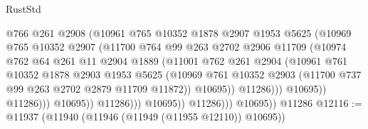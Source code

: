 \begin{lexlean}{RustStd}
\begin{coremodule}
                                    @766
                                    @261
                                    @2908
                                    (@10961
                                      @765
                                      @10352
                                      @1878
                                      @2907
                                      @1953
                                      @5625
                                      (@10969
                                        @765
                                        @10352
                                        @2907
                                        (@11700
                                          @764
                                          @99
                                          @263
                                          @2702
                                          @2906
                                          @11709
                                          (@10974
                                            @762
                                            @64
                                            @261
                                            @11
                                            @2904
                                            @1889
                                            (@11001
                                              @762
                                              @261
                                              @2904
                                              (@10961
                                                @761
                                                @10352
                                                @1878
                                                @2903
                                                @1953
                                                @5625
                                                (@10969
                                                  @761
                                                  @10352
                                                  @2903
                                                  (@11700 @737 @99 @263 @2702 @2879 @11709 @11872))
                                                @10695))
                                            @11286)))
                                      @10695))
                                  @11286)))
                            @10695))
                        @11286)))
                  @10695))
              @11286)))
        @10695))
    @11286
@12116 := @11937 (@11940 (@11946 (@11949 (@11955 @12110)) @10695))

\end{coremodule}
\end{lexlean}
